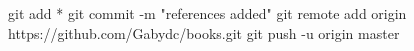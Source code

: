 
git add *
git commit -m "references added"
git remote add origin https://github.com/Gabydc/books.git
git push -u origin master
